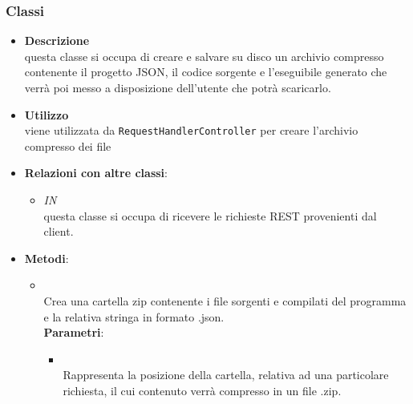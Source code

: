 \subsubsection{Classi}
\label{\nogloxy{swedesigner::server::utility::Compressor}}
\begin{figure}[h]
\centering
{}
\caption{}
\end{figure}
\FloatBarrier
\begin{itemize}
\item \textbf{Descrizione}\\
questa classe si occupa di creare e salvare su disco un archivio compresso contenente il progetto JSON, il codice sorgente e l'eseguibile generato che verrà poi messo a disposizione dell'utente che potrà scaricarlo.
\item \textbf{Utilizzo}\\
viene utilizzata da \texttt{RequestHandlerController} per creare l'archivio compresso dei file
\item \textbf{Relazioni con altre classi}:
\begin{itemize}
\item \textit{IN} \hyperref[\nogloxy{swedesigner::server::controller::RequestHandlerController}]{}\\
questa classe si occupa di ricevere le richieste REST provenienti dal client.
\end{itemize}
\item \textbf{Metodi}:
\begin{itemize}
\item {}
\\ Crea una cartella zip contenente i file sorgenti e compilati del programma e la relativa stringa in formato .json.
\\ \textbf{Parametri}:
\begin{itemize}
\item {}
\\ Rappresenta la posizione della cartella, relativa ad una particolare richiesta, il cui contenuto verrà compresso in un file .zip.
\end{itemize}
\end{itemize}
\end{itemize}
